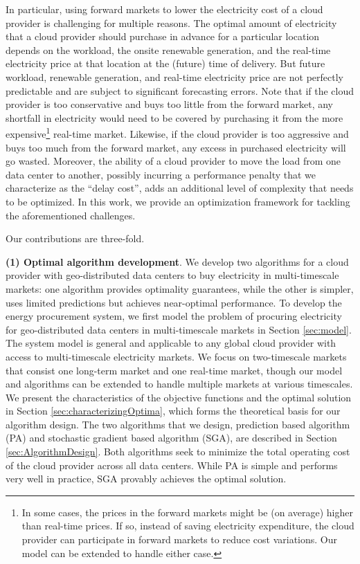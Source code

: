In particular, using forward markets to lower the electricity cost of a cloud provider is challenging for multiple reasons. The optimal amount of electricity that a cloud provider should purchase in advance for a particular location depends on the workload, the onsite renewable generation, and the real-time electricity price at that location at the (future) time of delivery. But future workload, renewable generation, and real-time electricity price are not perfectly predictable and are subject to significant forecasting errors. Note that if the cloud provider is too conservative and buys too little from the forward market, any shortfall in electricity would need to be covered by purchasing it from the more expensive\footnote{In some cases, the prices in the forward markets might be (on average) higher than real-time prices. If so, instead of saving electricity expenditure, the cloud provider can participate in forward markets to reduce cost variations. Our model can be extended to handle either case.} real-time market. Likewise, if the cloud provider is too aggressive and buys too much from the forward market, any excess in purchased electricity will go wasted. Moreover, the ability of a cloud provider to move the load from one data center to another, possibly incurring a performance penalty that we characterize as the ``delay cost'', adds an additional level of complexity that needs to be optimized. In this work, we provide an optimization framework for tackling the aforementioned challenges.


Our contributions are three-fold.

\textbf{(1) Optimal algorithm development}. We develop two algorithms for a cloud provider with geo-distributed data centers to buy electricity in multi-timescale markets: one algorithm provides optimality guarantees, while the other is simpler, uses limited predictions but achieves near-optimal performance.
To develop the energy procurement system, we first model the problem of procuring electricity for geo-distributed data centers in multi-timescale markets in Section \ref{sec:model}. The system model is general and applicable to any global cloud provider with access to multi-timescale electricity markets. We focus on two-timescale markets that consist one long-term market and one real-time market, though our model and algorithms can be extended to handle multiple markets at various timescales. We present the characteristics of the objective functions and the optimal solution in Section \ref{sec:characterizingOptima}, which forms the theoretical basis for our algorithm design. The two algorithms that we design, prediction based algorithm (PA) and stochastic gradient based algorithm (SGA), are described in Section \ref{sec:AlgorithmDesign}. Both algorithms seek to minimize the total operating cost of the cloud provider across all data centers. While PA is simple and performs very well in practice, SGA provably achieves the optimal solution. 

